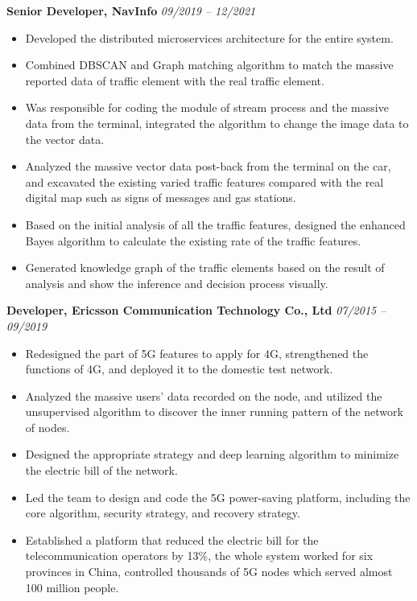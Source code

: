 \documentclass[11pt,a4paper]{article}
\begin{document}
\textbf{Senior Developer, NavInfo} \hfill \textit{09/2019 -- 12/2021}
\begin{itemize}
    \item Developed the distributed microservices architecture for the entire system.
    \item Combined DBSCAN and Graph matching algorithm to match the massive reported data of traffic element with the real traffic element.
    \item Was responsible for coding the module of stream process and the massive data from the terminal, integrated the algorithm to change the image data to the vector data.
    \item Analyzed the massive vector data post-back from the terminal on the car, and excavated the existing varied traffic features compared with the real digital map such as signs of messages and gas stations.
    \item Based on the initial analysis of all the traffic features, designed the enhanced Bayes algorithm to calculate the existing rate of the traffic features.
    \item Generated knowledge graph of the traffic elements based on the result of analysis and show the inference and decision process visually.
\end{itemize}

\vspace{5pt}

\textbf{Developer, Ericsson Communication Technology Co., Ltd} \hfill \textit{07/2015 -- 09/2019}
\begin{itemize}
    \item Redesigned the part of 5G features to apply for 4G, strengthened the functions of 4G, and deployed it to the domestic test network.
    \item Analyzed the massive users' data recorded on the node, and utilized the unsupervised algorithm to discover the inner running pattern of the network of nodes.
    \item Designed the appropriate strategy and deep learning algorithm to minimize the electric bill of the network.
    \item Led the team to design and code the 5G power-saving platform, including the core algorithm, security strategy, and recovery strategy.
    \item Established a platform that reduced the electric bill for the telecommunication operators by 13\%, the whole system worked for six provinces in China, controlled thousands of 5G nodes which served almost 100 million people.
\end{itemize}
\end{document}
